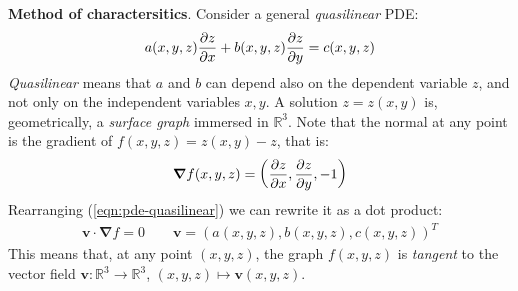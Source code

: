 \documentclass[../template.tex]{subfiles}
\begin{document}
\begin{exo}
    \begin{expl}
        \textbf{Method of charactersitics}. Consider a general \textit{quasilinear} PDE:
        \begin{align}
            a(x,y,z) \pdv{z}{x} + b(x,y,z) \pdv{z}{y} = c(x,y,z) \label{eqn:pde-quasilinear}
        \end{align}
        \textit{Quasilinear} means that $a$ and $b$ can depend also on the dependent variable $z$, and not only on the independent variables $x,y$. A solution $z=z(x,y)$ is, geometrically, a \textit{surface graph} immersed in $\mathbb{R}^3$. Note that the normal at any point is the gradient of $f(x,y,z) = z(x,y) - z$, that is:
        \begin{align*}
            \bm{\nabla} f(x,y,z) = \left(\pdv{z}{x} (x,y), \pdv{z}{y} (x,y), -1\right)
        \end{align*}  
        Rearranging (\ref{eqn:pde-quasilinear}) we can rewrite it as a dot product:
        \begin{align}\label{eqn:pde-h}
            \bm{v} \cdot \bm{\nabla}f = 0 \qquad \bm{v} = \left(a(x,y,z), b(x,y,z), c(x,y,z)\right)^T
        \end{align}
        This means that, at any point $(x,y,z)$, the graph $f(x,y,z)$ is \textit{tangent} to the vector field $\bm{v} \colon \mathbb{R}^3 \to \mathbb{R}^3$, $(x,y,z) \mapsto \bm{v}(x,y,z)$.
        

\end{expl}
\end{exo}
\end{document}
